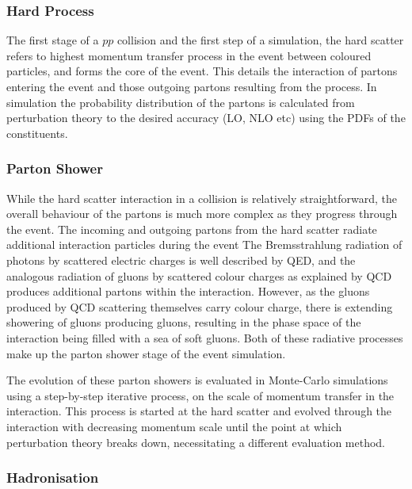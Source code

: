 		\subsubsection{Hard Process}

			The first stage of a $pp$ collision and the first step of a simulation, the hard scatter refers to highest momentum transfer process in the event between coloured particles, and forms the core of the event. This details the interaction of partons entering the event and those outgoing partons resulting from the process. In simulation the probability distribution of the partons is calculated from perturbation theory to the desired accuracy (LO, NLO etc) using the PDFs of the constituents.

		\subsubsection{Parton Shower}

			While the hard scatter interaction in a collision is relatively straightforward, the overall behaviour of the partons is much more complex as they progress through the event. The incoming and outgoing partons from the hard scatter radiate additional interaction particles during the event
			The Bremsstrahlung  radiation of photons by scattered electric charges is well described by QED, and the analogous radiation of gluons by scattered colour charges as explained by QCD produces additional partons within the interaction. However, as the gluons produced by QCD scattering themselves carry colour charge, there is extending showering of gluons producing gluons, resulting in the phase space of the interaction being filled with a sea of soft gluons. Both of these radiative processes make up the parton shower stage of the event simulation.

			The evolution of these parton showers is evaluated in Monte-Carlo simulations using a step-by-step iterative process, on the scale of momentum transfer in the interaction. This process is started at the hard scatter and evolved through the interaction with decreasing momentum scale until the point at which perturbation theory breaks down, necessitating a different evaluation method.

		\subsubsection{Hadronisation}
		\label{t:hadronisation}

